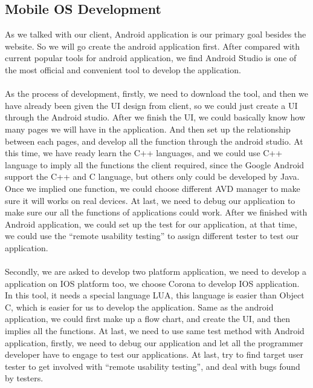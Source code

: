 \documentclass[letterpaper,10pt, draftclsnofoot,onecolumn]{IEEEtran}
\begin{document}
{{\subsection[Mobile OS Development]{\noindent\color{black}
Mobile OS Development}
\noindent As we talked with our client, Android application is our primary goal besides the website. So we will go create the android application first. After compared with current popular tools for android application, we find Android Studio is one of the most official and convenient tool to develop the application.
\\ \\
\noindent As the process of development, firstly, we need to download the tool, and then we have already been given the UI design from client, so we could just create a UI through the Android studio. After we finish the UI, we could basically know how many pages we will have in the application. And then set up the relationship between each pages, and develop all the function through the android studio. At this time, we have ready learn the C++ languages, and we could use C++ language to imply all the functions the client required, since the Google Android support the C++ and C language, but others only could be developed by Java. Once we implied one function, we could choose different AVD manager to make sure it will works on real devices. At last, we need to debug our application to make sure our all the functions of applications could work. After we finished with Android application, we could set up the test for our application, at that time, we could use the “remote usability testing” to assign different tester to test our application.
\\ \\
\noindent Secondly, we are asked to develop two platform application, we need to develop a application on IOS platform too, we choose Corona to develop IOS application. In this tool, it needs a special language LUA, this language is easier than Object C, which is easier for us to develop the application. Same as the android application, we could first make up a flow chart, and create the UI, and then implies all the functions. At last, we need to use same test method with Android application, firstly, we need to debug our application and let all the programmer developer have to engage to test our applications. At last, try to find target user tester to get involved with “remote usability testing”, and deal with bugs found by testers. 

{\noindent\color{black}

}}}
\end{document}
